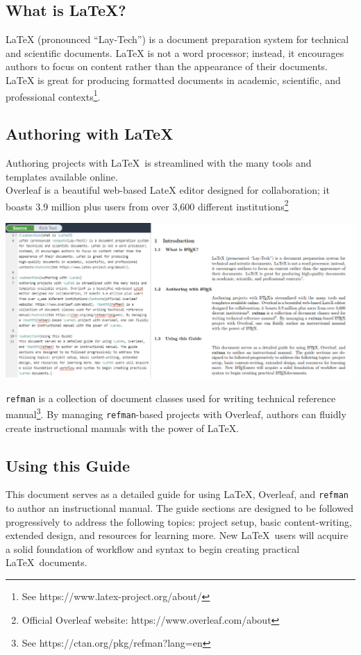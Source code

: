 

{\subsection{What is \LaTeX?}
LaTeX (pronounced \enquote{Lay-Tech}) is a document preparation system for technical and scientiﬁc documents. LaTeX is not a word processor; instead, it encourages authors to focus on content rather than the appearance of their documents. LaTeX is great for producing formatted documents in academic, scientific, and professional contexts\footnote{See https://www.latex-project.org/about/}.
\par


\subsection{Authoring with \LaTeX}
Authoring projects with \LaTeX\ is streamlined with the many tools and templates available online.\\
Overleaf is a beautiful web-based LateX editor designed for collaboration; it boasts 3.9 million plus users from over 3,600 diﬀerent institutions\footnote{Official Overleaf website: https://www.overleaf.com/about}
\par
\includegraphics[width=\linewidth]{graphics/IntroSource.png}
\par
\texttt{refman} is a collection of document classes used for writing technical reference manual\footnote{See https://ctan.org/pkg/refman?lang=en}. By managing \texttt{refman}-based projects with Overleaf, authors can fluidly create instructional manuals with the power of \LaTeX.

\subsection{Using this Guide}
This document serves as a detailed guide for using \LaTeX, Overleaf, and \texttt{refman} to author an instructional manual. The guide sections are designed to be followed progressively to address the following topics: project setup, basic content-writing, extended design, and resources for learning more. New \LaTeX\ users will acquire a solid foundation of workflow and syntax to begin creating practical \LaTeX\ documents.}